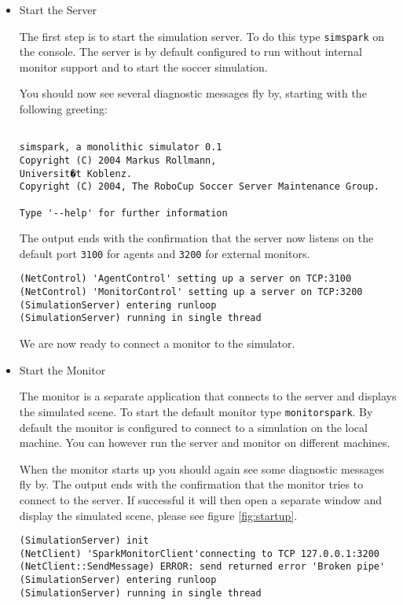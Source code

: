 \begin{itemize}
\item{Start the Server}

The first step is to start the simulation server. To do this type
\texttt{simspark} on the console. The server is by default configured
to run without internal monitor support and to start the soccer
simulation. 

You should now see several diagnostic messages fly by, starting with
the following greeting:

\begin{verbatim}

simspark, a monolithic simulator 0.1
Copyright (C) 2004 Markus Rollmann,
Universit�t Koblenz.
Copyright (C) 2004, The RoboCup Soccer Server Maintenance Group.

Type '--help' for further information

\end{verbatim}

The output ends with the confirmation that the server now listens on
the default port \texttt{3100} for agents and \texttt{3200} for
external monitors.

\begin{verbatim}
(NetControl) 'AgentControl' setting up a server on TCP:3100
(NetControl) 'MonitorControl' setting up a server on TCP:3200
(SimulationServer) entering runloop
(SimulationServer) running in single thread
\end{verbatim}

We are now ready to connect a monitor to the simulator.


\item{Start the Monitor}

The monitor is a separate application that connects to the server and
displays the simulated scene. To start the default monitor type
\texttt{monitorspark}. By default the monitor is configured to connect to a simulation 
on the local machine. You can however run the server and monitor on
different machines.

When the monitor starts up you should again see some diagnostic
messages fly by. The output ends with the confirmation that the
monitor tries to connect to the server. If successful it will then open
a separate window and display the simulated scene, please see figure
\ref{fig:startup}.

\begin{verbatim}
(SimulationServer) init
(NetClient) 'SparkMonitorClient'connecting to TCP 127.0.0.1:3200
(NetClient::SendMessage) ERROR: send returned error 'Broken pipe'
(SimulationServer) entering runloop
(SimulationServer) running in single thread
\end{verbatim}


\end{itemize}
